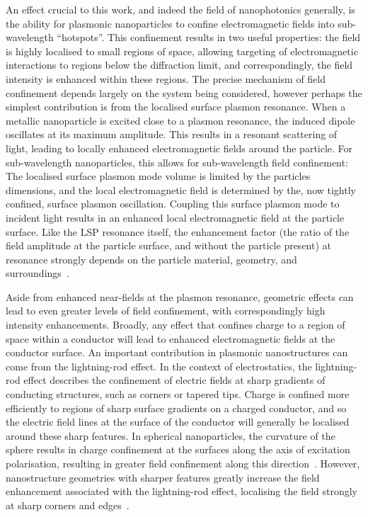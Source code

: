 An effect crucial to this work, and indeed the field of nanophotonics generally, is the ability for plasmonic nanoparticles to confine electromagnetic fields into sub-wavelength ``hotspots''. This confinement results in two useful properties: the field is highly localised to small regions of space, allowing targeting of electromagnetic interactions to regions below the diffraction limit, and correspondingly, the field intensity is enhanced within these regions. The precise mechanism of field confinement depends largely on the system being considered, however perhaps the simplest contribution is from the localised surface plasmon resonance. 
When a metallic nanoparticle is excited close to a plasmon resonance, the induced dipole oscillates at its maximum amplitude. This results in a resonant scattering of light, leading to locally enhanced electromagnetic fields around the particle. For sub-wavelength nanoparticles, this allows for sub-wavelength field confinement: The localised surface plasmon mode volume is limited by the particles dimensions, and the local electromagnetic field is determined by the, now tightly confined, surface plasmon oscillation. Coupling this surface plasmon mode to incident light results in an enhanced local electromagnetic field at the particle surface. Like the LSP resonance itself, the enhancement factor (the ratio of the field amplitude at the particle surface, and without the particle present) at resonance strongly depends on the particle material, geometry, and surroundings~\cite{Dynich2009, Tanabe2008}.

Aside from enhanced near-fields at the plasmon resonance, geometric effects can lead to even greater levels of field confinement, with correspondingly high intensity enhancements. Broadly, any effect that confines charge to a region of space within a conductor will lead to enhanced electromagnetic fields at the conductor surface. 
An important contribution in plasmonic nanostructures can come from the lightning-rod effect. In the context of electrostatics, the lightning-rod effect describes the confinement of electric fields at sharp gradients of conducting structures, such as corners or tapered tips. Charge is confined more efficiently to regions of sharp surface gradients on a charged conductor, and so the electric field lines at the surface of the conductor will generally be localised around these sharp features. In spherical nanoparticles, the curvature of the sphere results in charge confinement at the surfaces along the axis of excitation polarisation, resulting in greater field confinement along this direction~\cite{Tanabe2008}. However, nanostructure geometries with sharper features greatly increase the field enhancement associated with the lightning-rod effect, localising the field strongly at sharp corners and edges~\cite{Dreaden2011, Lee2010, Valev2012d}.

